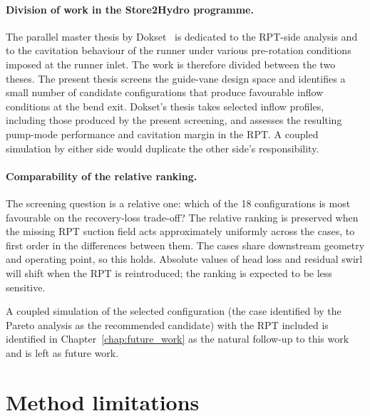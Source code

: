\paragraph{Division of work in the Store2Hydro programme.} The parallel master thesis by Dokset~\cite{Dokset2025} is dedicated to the RPT-side analysis and to the cavitation behaviour of the runner under various pre-rotation conditions imposed at the runner inlet. The work is therefore divided between the two theses. The present thesis screens the guide-vane design space and identifies a small number of candidate configurations that produce favourable inflow conditions at the bend exit. Dokset's thesis takes selected inflow profiles, including those produced by the present screening, and assesses the resulting pump-mode performance and cavitation margin in the RPT. A coupled simulation by either side would duplicate the other side's responsibility.
 
\paragraph{Comparability of the relative ranking.} The screening question is a relative one: which of the 18 configurations is most favourable on the recovery-loss trade-off? The relative ranking is preserved when the missing RPT suction field acts approximately uniformly across the cases, to first order in the differences between them. The cases share downstream geometry and operating point, so this holds. Absolute values of head loss and residual swirl will shift when the RPT is reintroduced; the ranking is expected to be less sensitive.
 
A coupled simulation of the selected configuration (the case identified by the Pareto analysis as the recommended candidate) with the RPT included is identified in Chapter~\ref{chap:future_work} as the natural follow-up to this work and is left as future work.
 
\section{Method limitations}
\label{sec:methods_limitations_master}
 
